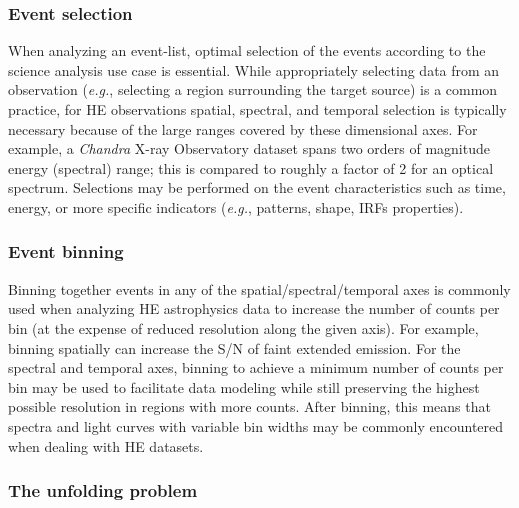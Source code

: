 \documentclass[11pt,a4paper]{ivoa}
\begin{document}
\subsubsection{Event selection}


When analyzing an event-list, optimal selection of the events according to the science analysis use case is essential.  While appropriately selecting data from an observation ({\em e.g.\/}, selecting a region surrounding the target source) is a common practice, for HE observations spatial, spectral, and temporal selection is typically necessary because of the large ranges covered by these dimensional axes.  For example, a {\em Chandra\/} X-ray Observatory dataset spans two orders of magnitude energy (spectral) range; this is compared to roughly a factor of 2 for an optical spectrum.  Selections may be performed on the event characteristics such as time, energy, or more specific indicators ({\em e.g.\/}, patterns, shape, IRFs properties).

\subsubsection{Event binning}

Binning together events in any of the spatial/spectral/temporal axes is commonly used when analyzing HE astrophysics data to increase the number of counts per bin (at the expense of reduced resolution along the given axis).  For example, binning spatially can increase the S/N of faint extended emission.  For the spectral and temporal axes, binning to achieve a minimum number of counts per bin may be used  to facilitate data modeling while still preserving the highest possible resolution in regions with more counts.  After binning, this means that  spectra and light curves with variable bin widths may be commonly encountered when dealing with HE datasets.

\subsubsection{The unfolding problem}

\end{document}
